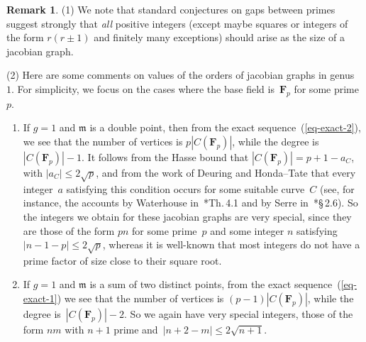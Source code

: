 \documentclass[12pt]{amsart}
\renewcommand{\leq}{\leqslant}
\numberwithin{equation}{section}
\newcommand{\Ff}{\mathbf{F}}
\newcommand{\mfm}{\mathfrak{m}}
\theoremstyle{plain}
\theoremstyle{remark}
\theoremstyle{definition}
\newtheorem{remark}[theorem]{Remark}
\renewcommand{\leq}{\leqslant}
\begin{document}
\begin{remark}\label{rm-n}
  (1) We note that standard conjectures on gaps between primes suggest
  strongly that \emph{all} positive integers (except maybe squares or integers of the form
  $r(r\pm 1)$ and finitely many exceptions) should arise as the size of a
  jacobian graph.
  
  (2) Here are some comments on values of the orders of jacobian graphs
  in genus~$1$. For simplicity, we focus on the cases where the base
  field is~$\Ff_p$ for some prime~$p$.

  \begin{enumerate}
  \item If $g=1$ and $\mfm$ is a double point, then from the exact
    sequence~(\ref{eq-exact-2}), we see that the number of vertices is
    $p|C(\Ff_p)|$, while the degree is~$|C(\Ff_p)|-1$. It follows from
    the Hasse bound that $|C(\Ff_p)|=p+1-a_C$, with
    $|a_C|\leq 2\sqrt{p}$, and from the work of Deuring and Honda--Tate
    that every integer~$a$ satisfying this condition occurs for some
    suitable curve~$C$ (see, for instance, the
    accounts by Waterhouse in~\cite{waterhouse}*{Th.\,4.1} and by Serre
    in~\cite{serre-points}*{\S\,2.6}). So the integers we obtain for
    these jacobian graphs are very special, since they are those of the
    form $pn$ for some prime~$p$ and some integer $n$ satisfying
    $|n-1-p|\leq 2\sqrt{p}$, whereas it is well-known that most integers
    do not have a prime factor of size close to their square root.

  \item If $g=1$ and $\mfm$ is a sum of two distinct points, from the
    exact sequence~(\ref{eq-exact-1}) we see that the number of vertices
    is $(p-1)|C(\Ff_p)|$, while the degree is~$|C(\Ff_p)|-2$. So we
    again have very special integers, those of the form $nm$ with $n+1$
    prime and~$|n+2-m|\leq 2\sqrt{n+1}$.
  \end{enumerate}
\end{remark}
\end{document}
